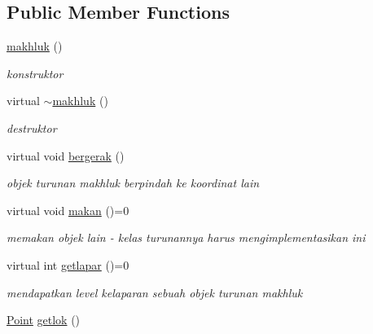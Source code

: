 \subsection*{Public Member Functions}
\begin{DoxyCompactItemize}
\item 
\hyperlink{classmakhluk_adbc575116661f7837693c1038aa16c40}{makhluk} ()\hypertarget{classmakhluk_adbc575116661f7837693c1038aa16c40}{}\label{classmakhluk_adbc575116661f7837693c1038aa16c40}

\begin{DoxyCompactList}\small\item\em konstruktor \end{DoxyCompactList}\item 
virtual \hyperlink{classmakhluk_a29be824daa6c805d6259a2db6870b943}{$\sim$makhluk} ()\hypertarget{classmakhluk_a29be824daa6c805d6259a2db6870b943}{}\label{classmakhluk_a29be824daa6c805d6259a2db6870b943}

\begin{DoxyCompactList}\small\item\em destruktor \end{DoxyCompactList}\item 
virtual void \hyperlink{classmakhluk_a0b4d95d9f0dc0662360064e31d3a986c}{bergerak} ()\hypertarget{classmakhluk_a0b4d95d9f0dc0662360064e31d3a986c}{}\label{classmakhluk_a0b4d95d9f0dc0662360064e31d3a986c}

\begin{DoxyCompactList}\small\item\em objek turunan makhluk berpindah ke koordinat lain \end{DoxyCompactList}\item 
virtual void \hyperlink{classmakhluk_a36493787b5e974f2f6d3da7b260ac9cf}{makan} ()=0\hypertarget{classmakhluk_a36493787b5e974f2f6d3da7b260ac9cf}{}\label{classmakhluk_a36493787b5e974f2f6d3da7b260ac9cf}

\begin{DoxyCompactList}\small\item\em memakan objek lain -\/ kelas turunannya harus mengimplementasikan ini \end{DoxyCompactList}\item 
virtual int \hyperlink{classmakhluk_a9e348a59401f5e66aae435d6b73d0481}{getlapar} ()=0\hypertarget{classmakhluk_a9e348a59401f5e66aae435d6b73d0481}{}\label{classmakhluk_a9e348a59401f5e66aae435d6b73d0481}

\begin{DoxyCompactList}\small\item\em mendapatkan level kelaparan sebuah objek turunan makhluk \end{DoxyCompactList}\item 
\hyperlink{class_point}{Point} \hyperlink{classmakhluk_a484f54517aaf27f21e6414c7f5fadd7b}{getlok} ()\hypertarget{classmakhluk_a484f54517aaf27f21e6414c7f5fadd7b}{}\label{classmakhluk_a484f54517aaf27f21e6414c7f5fadd7b}


\end{DoxyCompactItemize}
